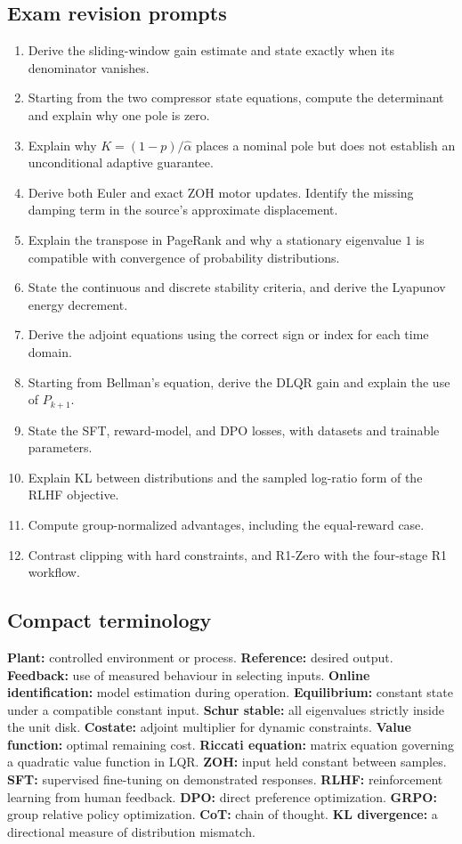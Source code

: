 \documentclass[11pt,a4paper]{article}
\numberwithin{equation}{section}
\numberwithin{figure}{section}
\numberwithin{table}{section}
\begin{document}
\subsection{Exam revision prompts}
\begin{enumerate}
\item Derive the sliding-window gain estimate and state exactly when its denominator vanishes.
\item Starting from the two compressor state equations, compute the determinant and explain why one pole is zero.
\item Explain why $K=(1-p)/\widehat\alpha$ places a nominal pole but does not establish an unconditional adaptive guarantee.
\item Derive both Euler and exact ZOH motor updates. Identify the missing damping term in the source's approximate displacement.
\item Explain the transpose in PageRank and why a stationary eigenvalue $1$ is compatible with convergence of probability distributions.
\item State the continuous and discrete stability criteria, and derive the Lyapunov energy decrement.
\item Derive the adjoint equations using the correct sign or index for each time domain.
\item Starting from Bellman's equation, derive the DLQR gain and explain the use of $P_{k+1}$.
\item State the SFT, reward-model, and DPO losses, with datasets and trainable parameters.
\item Explain KL between distributions and the sampled log-ratio form of the RLHF objective.
\item Compute group-normalized advantages, including the equal-reward case.
\item Contrast clipping with hard constraints, and R1-Zero with the four-stage R1 workflow.
\end{enumerate}

\subsection{Compact terminology}
\textbf{Plant:} controlled environment or process. \textbf{Reference:} desired output. \textbf{Feedback:} use of measured behaviour in selecting inputs. \textbf{Online identification:} model estimation during operation. \textbf{Equilibrium:} constant state under a compatible constant input. \textbf{Schur stable:} all eigenvalues strictly inside the unit disk. \textbf{Costate:} adjoint multiplier for dynamic constraints. \textbf{Value function:} optimal remaining cost. \textbf{Riccati equation:} matrix equation governing a quadratic value function in LQR. \textbf{ZOH:} input held constant between samples. \textbf{SFT:} supervised fine-tuning on demonstrated responses. \textbf{RLHF:} reinforcement learning from human feedback. \textbf{DPO:} direct preference optimization. \textbf{GRPO:} group relative policy optimization. \textbf{CoT:} chain of thought. \textbf{KL divergence:} a directional measure of distribution mismatch.
\end{document}
